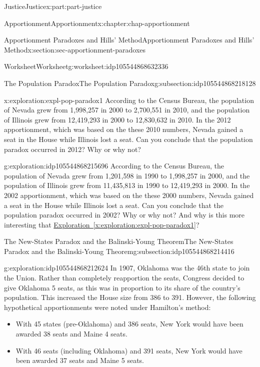 \documentclass[oneside,10pt,]{book}
\newcommand{\xreffont}{\relax}
\numberwithin{equation}{section}
\begin{document}
\begin{partptx}{Justice}{}{Justice}{}{}{x:part:part-justice}
\begin{chapterptx}{Apportionment}{}{Apportionment}{}{}{x:chapter:chap-apportionment}
\begin{sectionptx}{Apportionment Paradoxes and Hills' Method}{}{Apportionment Paradoxes and Hills' Method}{}{}{x:section:sec-apportionment-paradoxes}
\begin{worksheet-subsection}{Worksheet}{}{Worksheet}{}{}{g:worksheet:idp105544868632336}
\begin{subsectionptx}{The Population Paradox}{}{The Population Paradox}{}{}{g:subsection:idp105544868218128}
\begin{exploration}{}{x:exploration:expl-pop-paradox1}%
According to the Census Bureau, the population of Nevada grew from 1,998,257 in 2000 to 2,700,551 in 2010, and the population of Illinois grew from 12,419,293 in 2000 to 12,830,632 in 2010. In the 2012 apportionment, which was based on the these 2010 numbers, Nevada gained a seat in the House while Illinois lost a seat. Can you conclude that the population paradox occurred in 2012? Why or why not?%
\vspace{1.5in}
\end{exploration}%
\begin{exploration}{}{g:exploration:idp105544868215696}%
According to the Census Bureau, the population of Nevada grew from 1,201,598 in 1990 to 1,998,257 in 2000, and the population of Illinois grew from 11,435,813 in 1990 to 12,419,293 in 2000. In the 2002 apportionment, which was based on the these 2000 numbers, Nevada gained a seat in the House while Illinois lost a seat. Can you conclude that the population paradox occurred in 2002? Why or why not? And why is this more interesting that \hyperref[x:exploration:expl-pop-paradox1]{Exploration~{\xreffont\ref{x:exploration:expl-pop-paradox1}}}?%
\vspace{1.5in}
\end{exploration}%
\end{subsectionptx}
\newpage
%
%
\typeout{************************************************}
\typeout{************************************************}
%
\begin{subsectionptx}{The New-States Paradox and the Balinski-Young Theorem}{}{The New-States Paradox and the Balinski-Young Theorem}{}{}{g:subsection:idp105544868214416}
\begin{exploration}{}{g:exploration:idp105544868212624}%
In 1907, Oklahoma was the 46th state to join the Union. Rather than completely reapportion the seats, Congress decided to give Oklahoma 5 seats, as this was in proportion to its share of the country's population. This increased the House size from 386 to 391. However, the following hypothetical apportionments were noted under Hamilton's method:%
%
\begin{itemize}[label=\textbullet]
\item{}With 45 states (pre-Oklahoma) and 386 seats, New York would have been awarded 38 seats and Maine 4 seats.%
\item{}With 46 seats (including Oklahoma) and 391 seats, New York would have been awarded 37 seats and Maine 5 seats.%

\end{itemize}
\end{exploration}
\end{subsectionptx}
\end{worksheet-subsection}
\end{sectionptx}
\end{chapterptx}
\end{partptx}
\end{document}
